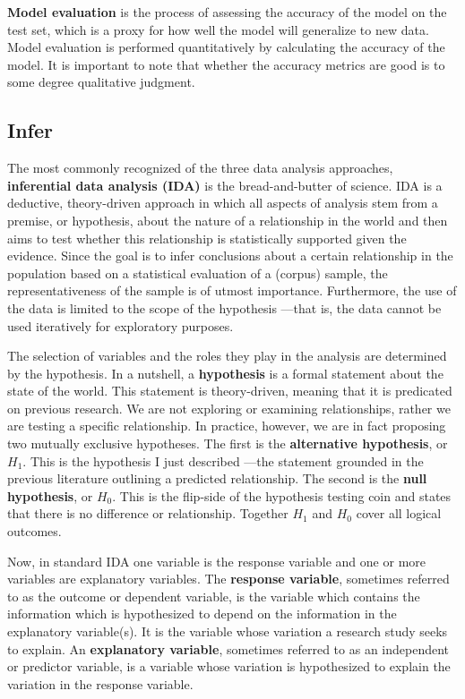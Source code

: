 \documentclass[
  letterpaper,
  krantz1]{latex/krantz-mod}
\theoremstyle{definition}
\theoremstyle{definition}
\theoremstyle{remark}
\begin{document}
\textbf{Model evaluation} is the process of
assessing the accuracy of the model on the test set, which is a proxy
for how well the model will generalize to new data. Model evaluation is
performed quantitatively by calculating the accuracy of the model. It is
important to note that whether the accuracy metrics are good is to some
degree qualitative judgment.

\subsection{Infer}\label{sec-analysis-infer}

The most commonly recognized of the three data analysis approaches,
\textbf{inferential data analysis
(IDA)} is the bread-and-butter of
science. IDA is a deductive, theory-driven
approach in which all aspects of analysis stem from a premise, or
hypothesis, about the nature of a relationship in the
world and then aims to test whether this relationship is statistically
supported given the evidence. Since the goal is to infer conclusions
about a certain relationship in the population based on a statistical
evaluation of a (corpus) sample, the
representativeness of the sample is of utmost
importance. Furthermore, the use of the data is limited to the scope of
the hypothesis ---that is, the data cannot be used iteratively for
exploratory purposes.

The selection of variables and the roles they play in the analysis are
determined by the hypothesis. In a nutshell, a
\textbf{hypothesis} is a formal statement about the
state of the world. This statement is theory-driven, meaning that it is
predicated on previous research. We are not exploring or examining
relationships, rather we are testing a specific relationship. In
practice, however, we are in fact proposing two mutually exclusive
hypotheses. The first is the \textbf{alternative
hypothesis}, or \(H_1\). This is the
hypothesis I just described ---the statement grounded in the previous
literature outlining a predicted relationship. The second is the
\textbf{null hypothesis}, or \(H_0\). This is the
flip-side of the hypothesis testing coin and states that there is no
difference or relationship. Together \(H_1\) and \(H_0\) cover all
logical outcomes.

Now, in standard IDA one variable is the response variable and one or
more variables are explanatory variables. The \textbf{response
variable}, sometimes referred to as the outcome
or dependent variable, is the variable which contains the information
which is hypothesized to depend on the information in the explanatory
variable(s). It is the variable whose variation a research study seeks
to explain. An \textbf{explanatory
variable}, sometimes referred to as an
independent or predictor variable, is a variable whose variation is
hypothesized to explain the variation in the response variable.
\end{document}
